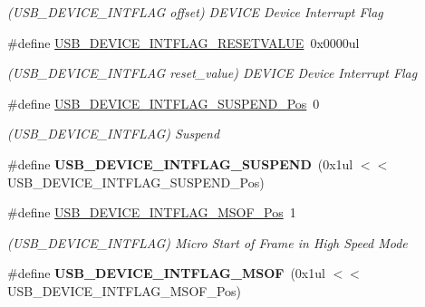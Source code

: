 \begin{DoxyCompactItemize}
\begin{DoxyCompactList}\small\item\em (U\+S\+B\+\_\+\+D\+E\+V\+I\+C\+E\+\_\+\+I\+N\+T\+F\+L\+A\+G offset) D\+E\+V\+I\+C\+E Device Interrupt Flag \end{DoxyCompactList}\item 
\hypertarget{group___s_a_m_l21___u_s_b_gaf1e950a2148a5232135f8163359e1ecf}{}\#define \hyperlink{group___s_a_m_l21___u_s_b_gaf1e950a2148a5232135f8163359e1ecf}{U\+S\+B\+\_\+\+D\+E\+V\+I\+C\+E\+\_\+\+I\+N\+T\+F\+L\+A\+G\+\_\+\+R\+E\+S\+E\+T\+V\+A\+L\+U\+E}~0x0000ul\label{group___s_a_m_l21___u_s_b_gaf1e950a2148a5232135f8163359e1ecf}

\begin{DoxyCompactList}\small\item\em (U\+S\+B\+\_\+\+D\+E\+V\+I\+C\+E\+\_\+\+I\+N\+T\+F\+L\+A\+G reset\+\_\+value) D\+E\+V\+I\+C\+E Device Interrupt Flag \end{DoxyCompactList}\item 
\hypertarget{group___s_a_m_l21___u_s_b_ga74cd2f11552b3ce894d82e5c3f540c8b}{}\#define \hyperlink{group___s_a_m_l21___u_s_b_ga74cd2f11552b3ce894d82e5c3f540c8b}{U\+S\+B\+\_\+\+D\+E\+V\+I\+C\+E\+\_\+\+I\+N\+T\+F\+L\+A\+G\+\_\+\+S\+U\+S\+P\+E\+N\+D\+\_\+\+Pos}~0\label{group___s_a_m_l21___u_s_b_ga74cd2f11552b3ce894d82e5c3f540c8b}

\begin{DoxyCompactList}\small\item\em (U\+S\+B\+\_\+\+D\+E\+V\+I\+C\+E\+\_\+\+I\+N\+T\+F\+L\+A\+G) Suspend \end{DoxyCompactList}\item 
\hypertarget{group___s_a_m_l21___u_s_b_ga84dd179cf9b177834f10d047027f6634}{}\#define {\bfseries U\+S\+B\+\_\+\+D\+E\+V\+I\+C\+E\+\_\+\+I\+N\+T\+F\+L\+A\+G\+\_\+\+S\+U\+S\+P\+E\+N\+D}~(0x1ul $<$$<$ U\+S\+B\+\_\+\+D\+E\+V\+I\+C\+E\+\_\+\+I\+N\+T\+F\+L\+A\+G\+\_\+\+S\+U\+S\+P\+E\+N\+D\+\_\+\+Pos)\label{group___s_a_m_l21___u_s_b_ga84dd179cf9b177834f10d047027f6634}

\item 
\hypertarget{group___s_a_m_l21___u_s_b_ga3f060ff63d10883b93e140f2efe28972}{}\#define \hyperlink{group___s_a_m_l21___u_s_b_ga3f060ff63d10883b93e140f2efe28972}{U\+S\+B\+\_\+\+D\+E\+V\+I\+C\+E\+\_\+\+I\+N\+T\+F\+L\+A\+G\+\_\+\+M\+S\+O\+F\+\_\+\+Pos}~1\label{group___s_a_m_l21___u_s_b_ga3f060ff63d10883b93e140f2efe28972}

\begin{DoxyCompactList}\small\item\em (U\+S\+B\+\_\+\+D\+E\+V\+I\+C\+E\+\_\+\+I\+N\+T\+F\+L\+A\+G) Micro Start of Frame in High Speed Mode \end{DoxyCompactList}\item 
\hypertarget{group___s_a_m_l21___u_s_b_gab197b94a8b47b1fa6c8765fa08d8cf65}{}\#define {\bfseries U\+S\+B\+\_\+\+D\+E\+V\+I\+C\+E\+\_\+\+I\+N\+T\+F\+L\+A\+G\+\_\+\+M\+S\+O\+F}~(0x1ul $<$$<$ U\+S\+B\+\_\+\+D\+E\+V\+I\+C\+E\+\_\+\+I\+N\+T\+F\+L\+A\+G\+\_\+\+M\+S\+O\+F\+\_\+\+Pos)\label{group___s_a_m_l21___u_s_b_gab197b94a8b47b1fa6c8765fa08d8cf65}


\end{DoxyCompactItemize}
